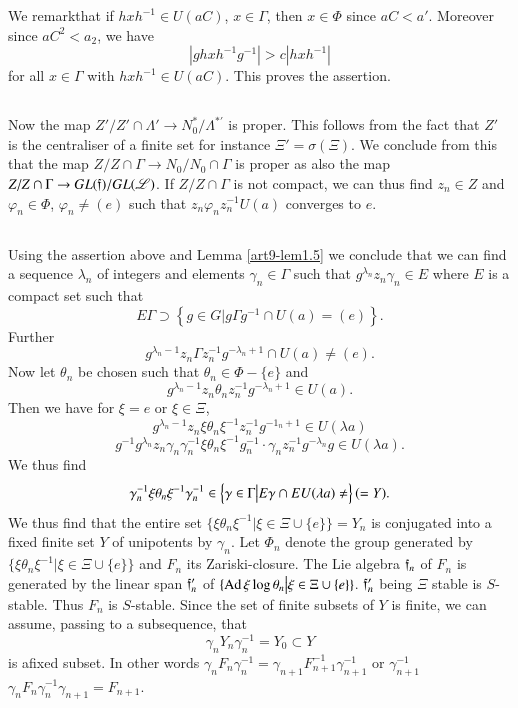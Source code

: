 We remark\pageoriginale that if $hxh^{-1} \in U (aC)$, $x \in\Gamma$, then $x \in \Phi$ since $a C < a'$. Moreover since $a C^2 < a_2$, we have
$$
|g h x h^{-1} g^{-1}| > c |h x  h^{-1}|
$$
for all $x \in \Gamma$ with $hxh^{-1} \in U(a C)$. This proves the assertion.

\setcounter{subsection}{38}
\subsection{}\label{art9-subsec2.39}
Now the map $Z'/Z'\cap \Lambda' \to N^\ast_0 / \Lambda^{\ast'}$ is proper. This follows from the fact that $Z'$ is the centraliser of a finite set for instance $\Xi' = \sigma (\Xi)$. We conclude from this that the map $Z/Z \cap \Gamma \to N_0/N_0 \cap \Gamma$ is proper as also the map $Z /Z \cap \Gamma \to G L (\mathfrak{f})/ G L (\mathscr{L})$. If $Z/ Z \cap \Gamma$ is not compact, we can thus find $z_n \in Z$ and $\varphi_n \in \Phi$, $\varphi_n \neq (e)$ such that $z_n \varphi_n z_n^{-1} U (a)$ converges to $e$.

\subsection{}\label{art9-subsec2.40}
Using the assertion above and Lemma \ref{art9-lem1.5} we conclude that we can find a sequence $\lambda_n$ of integers and elements $\gamma_n \in \Gamma$ such that $g^{\lambda_n} z_n \gamma_n \in E$ where $E$ is a compact set such that
$$
E \Gamma\supset \left\{g \in G \big| g \Gamma g^{-1} \cap U (a) = (e) \right\}.
$$
Further
$$
g^{\lambda_n -1} z_n \Gamma z^{-1}_n g^{-\lambda_n +1} \cap U (a) \neq (e).
$$
Now let $\theta_n$ be chosen such that $\theta_n \in \Phi - \{e\}$ and 
$$
g^{\lambda_n -1 } z_n \theta_n z^{-1}_n g^{-\lambda_n +1} \in U (a).
$$
Then we have for $\xi = e$ or $\xi \in \Xi$,
$$
g^{\lambda_n -1 } z_n \xi \theta_n \xi^{-1} z^{-1}_n g^{-1_n +1} \in U (\lambda a)
$$
\ie
$$
g^{-1} g^{\lambda_n} z_n \gamma_n \gamma^{-1}_n \xi \theta_n \xi^{-1} g^{-1}_n \cdot \gamma_n z^{-1}_n g^{-\lambda_n} g \in U (\lambda a).
$$
We thus find 
$$
\gamma^{-1}_n \xi \theta_n \xi^{-1} \gamma^{-1}_n \in \left\{\gamma \in \Gamma \big| E \gamma \cap E U (\lambda a) \neq \empty \right\} (= Y).
$$
We thus find that the entire set $\{\xi \theta_n \xi^{-1} \big| \xi \in \Xi \cup \{e\}\}= Y_n$ is conjugated into a fixed finite set $Y$ of unipotents by $\gamma_n$. Let $\Phi_n$ denote the group generated by $\{\xi \theta_n \xi^{-1} \big| \xi \in \Xi \cup \{e\}\}$ and $F_n$ its Zariski-closure. The Lie algebra $\mathfrak{f}_n$ of $F_n$ is generated by the linear span $\mathfrak{f}'_n$ of $\{\operatorname{Ad} \xi \log \theta_n \big| \xi \in \Xi \cup \{e\}\}$. $\mathfrak{f}'_n$ being $\Xi$ stable is $S$-stable. Thus $F_n$ is $S$-stable. Since the set of finite subsets of $Y$ is finite, we can assume, passing to a subsequence, that 
$$
\gamma_n Y_n \gamma^{-1}_n = Y_0 \subset Y
$$
is a\pageoriginale fixed subset. In other words $\gamma_n F_n \gamma^{-1}_n = \gamma_{n+1} F^{-1}_{n+1} \gamma^{-1}_{n+1}$ or $\gamma^{-1}_{n+1}$\break $\gamma_n F_n \gamma^{-1}_n \gamma_{n+1} = F_{n+1}$.

